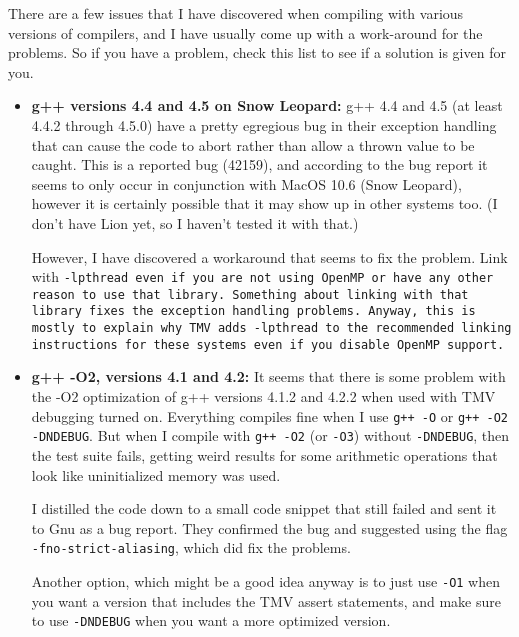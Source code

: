 There are a few issues that I have discovered when compiling with various 
versions of compilers, and I have usually come up with a work-around for
the problems.  So if you have a problem, check this list to see if a solution
is given for you.  

\begin{itemize}
\item {\bf g++ versions 4.4 and 4.5 on Snow Leopard:}
g++ 4.4 and 4.5 (at least 4.4.2 through 4.5.0) have a pretty egregious bug in their exception handling that 
can cause the code to abort rather than allow a thrown value to be caught.  
This is a reported bug (42159), and according to the bug report it seems to only occur in
conjunction with MacOS 10.6 (Snow Leopard), however it is certainly possible that it 
may show up in other systems too.  (I don't have Lion yet, so I haven't tested it with that.)

However, I have discovered a workaround that seems to fix the problem.  Link with 
\tt{-lpthread} even if you are not using OpenMP or have any other reason to use that
library.  Something about linking with that library fixes the exception handling problems.
Anyway, this is mostly to explain why TMV adds \tt{-lpthread} to the recommended linking instructions for these systems even if you disable OpenMP support.

\item {\bf g++ -O2, versions 4.1 and 4.2:}
It seems that there is some problem with the -O2 optimization of g++ versions 4.1.2 and 4.2.2
when used with TMV debugging turned on.  Everything compiles fine when I use
\texttt{g++ -O} or \texttt{g++ -O2 -DNDEBUG}.  But when I compile with \texttt{g++ -O2} (or \texttt{-O3}) without
\texttt{-DNDEBUG}, then the test suite fails, getting weird results for some arithmetic operations
that look like uninitialized memory was used.  

I distilled the code down to a small code snippet that still failed 
and sent it to Gnu as a bug report.
They confirmed the bug and suggested
using the flag \texttt{-fno-strict-aliasing}, which did fix the problems.

Another option, which might be a good idea anyway is to just use \texttt{-O1} 
when you want a version that 
includes the TMV assert statements, and make sure to use \texttt{-DNDEBUG} 
when you want a more optimized version.


\end{itemize}
